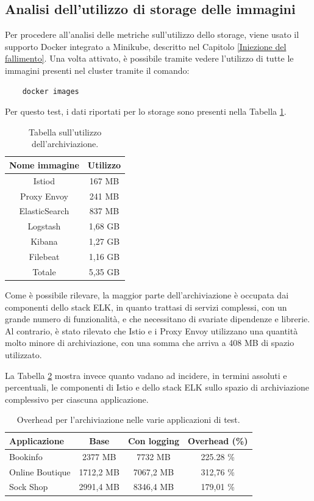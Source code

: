 \subsection{Analisi dell'utilizzo di storage delle immagini}
Per procedere all'analisi delle metriche sull'utilizzo dello storage, viene usato il supporto Docker integrato a Minikube, descritto nel Capitolo \ref{Iniezione del fallimento}. Una volta attivato, è possibile tramite vedere l'utilizzo di tutte le immagini presenti nel cluster tramite il comando:
\begin{lstlisting}
    docker images
\end{lstlisting}
Per questo test, i dati riportati per lo storage sono presenti nella Tabella \ref{tab:storage_usage}.
\begin{table}[H]
    \centering
    \begin{tabular}{|c|c|}
    \hline
    \rowcolor{lightgray}
        Nome immagine & Utilizzo \\ \hline
       Istiod  &  167 MB \\ \hline
       Proxy Envoy & 241 MB\\ \hline
       ElasticSearch  & 837 MB\\ \hline
       Logstash & 1,68 GB\\ \hline
       Kibana & 1,27 GB\\ \hline
       Filebeat & 1,16 GB\\ \hline
      \rowcolor{lightgray}
      Totale & 5,35 GB \\ \hline
    \end{tabular}
    \caption{Tabella sull'utilizzo dell'archiviazione.}
    \label{tab:storage_usage}
\end{table}
Come è possibile rilevare, la maggior parte dell'archiviazione è occupata dai componenti dello stack ELK, in quanto trattasi di servizi complessi, con un grande numero di funzionalità, e che necessitano di svariate dipendenze e librerie. Al contrario, è stato rilevato che Istio e i Proxy Envoy utilizzano una quantità molto minore di archiviazione, con una somma che arriva a 408 MB di spazio utilizzato.

La Tabella \ref{table:storage_comparison} mostra invece quanto vadano ad incidere, in termini  assoluti e percentuali, le componenti di Istio e dello stack ELK sullo spazio di archiviazione complessivo per ciascuna applicazione.

\begin{table}[h]
\centering
\begin{tabular}{|l|c|c|c|}
\hline
\rowcolor{lightgray}
\textbf{Applicazione} & \textbf{Base} & \textbf{Con logging} & \textbf{Overhead (\%)} \\
\hline
Bookinfo & 2377 MB & 7732 MB & 225.28 \% \\
\hline
Online Boutique & 1712,2 MB & 7067,2 MB & 312,76 \% \\
\hline
Sock Shop & 2991,4 MB & 8346,4 MB & 179,01 \% \\
\hline
\end{tabular}
\caption{Overhead per l'archiviazione nelle varie applicazioni di test.}
\label{table:storage_comparison}
\end{table}




